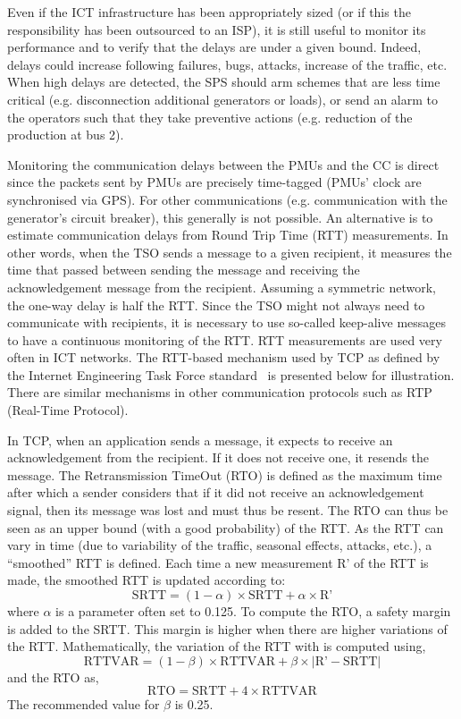 Even if the ICT infrastructure has been appropriately sized (or if this the responsibility has been outsourced to an ISP), it is still useful to monitor its performance and to verify that the delays are under a given bound. Indeed, delays could increase following failures, bugs, attacks, increase of the traffic, etc. When high delays are detected, the SPS should arm schemes that are less time critical (e.g. disconnection additional generators or loads), or send an alarm to the operators such that they take preventive actions (e.g. reduction of the production at bus 2).

Monitoring the communication delays between the PMUs and the CC is direct since the packets sent by PMUs are precisely time-tagged (PMUs' clock are synchronised via GPS). For other communications (e.g. communication with the generator's circuit breaker), this generally is not possible. An alternative is to estimate communication delays from Round Trip Time (RTT) measurements. In other words, when the TSO sends a message to a given recipient, it measures the time that passed between sending the message and receiving the acknowledgement message from the recipient. Assuming a symmetric network, the one-way delay is half the RTT. Since the TSO might not always need to communicate with recipients, it is necessary to use so-called keep-alive messages to have a continuous monitoring of the RTT. RTT measurements are used very often in ICT networks. The RTT-based mechanism used by TCP as defined by the Internet Engineering Task Force standard~\cite{roundTripTime} is presented below for illustration. There are similar mechanisms in other communication protocols such as RTP (Real-Time Protocol).

In TCP, when an application sends a message, it expects to receive an acknowledgement from the recipient. If it does not receive one, it resends the message. The Retransmission TimeOut (RTO) is defined as the maximum time after which a sender considers that if it did not receive an acknowledgement signal, then its message was lost and must thus be resent. The RTO can thus be seen as an upper bound (with a good probability) of the RTT. As the RTT can vary in time (due to variability of the traffic, seasonal effects, attacks, etc.), a ``smoothed'' RTT is defined. Each time a new measurement R' of the RTT is made, the smoothed RTT is updated according to:
%
\begin{equation}\text{SRTT} = (1-\alpha)\times\text{SRTT} + \alpha\times\text{R'}\end{equation}
%
where \(\alpha\) is a parameter often set to 0.125. To compute the RTO, a safety margin is added to the SRTT. This margin is higher when there are higher variations of the RTT. Mathematically, the variation of the RTT with is computed using,
%
\begin{equation}\text{RTTVAR} = (1-\beta)\times\text{RTTVAR} + \beta\times |\text{R'}-\text{SRTT}|\end{equation}
%
and the RTO as,
%
\begin{equation}\text{RTO} = \text{SRTT} + 4 \times \text{RTTVAR}\end{equation}
%
The recommended value for \(\beta\) is 0.25.


